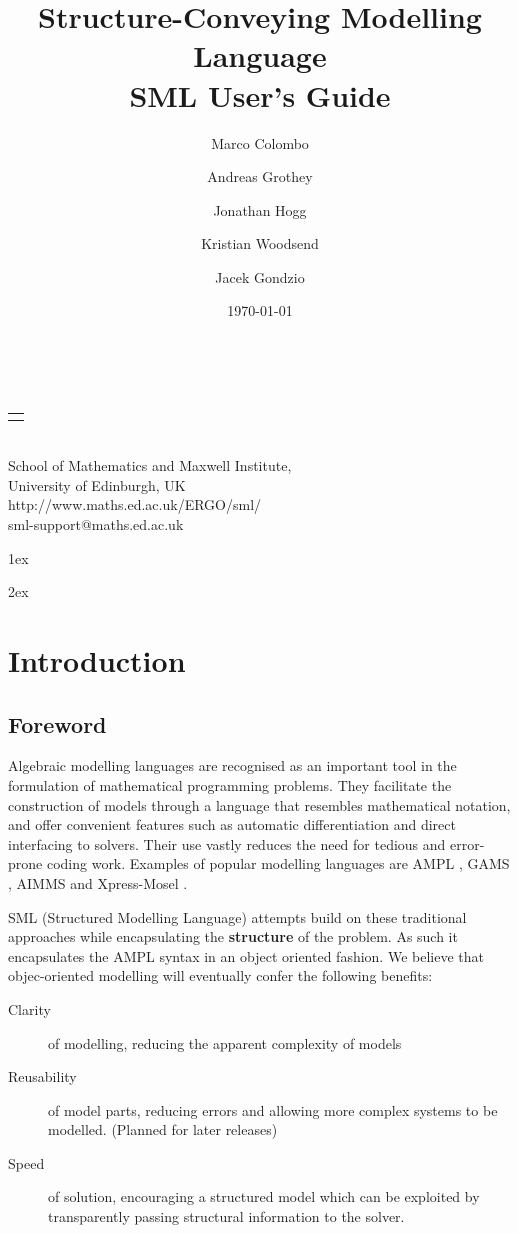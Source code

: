 \documentclass[10pt,a4paper]{report}
\makeatletter
\renewcommand{\maketitle}{
\thispagestyle{empty}
\begin{center}
\vspace*{4cm}
{\rmfamily\Huge \@title}\\
\vspace{2cm}
{\rmfamily\Large
\begin{tabular}[t]{c}%
        \@author
      \end{tabular}
}\\
\vspace{1cm}
{\rmfamily\Large School of Mathematics and Maxwell Institute, \\[0.5ex]
University of Edinburgh, UK} \\[5ex]
{\ttfamily\Large http://www.maths.ed.ac.uk/ERGO/sml/ \\[0.5ex]
                 sml-support@maths.ed.ac.uk}\\
\vspace{2cm}
{\rmfamily \Large \@date}
\end{center}
\clearpage
}
\makeatother
\begin{document}
\title{Structure-Conveying Modelling Language \\[1em]
   \textbf{SML User's Guide}}
\author{Marco Colombo
  \and Andreas Grothey
  \and Jonathan Hogg
  \and Kristian Woodsend
  \and Jacek Gondzio}
\date{\today}

\maketitle

\parindent 0pt
\parskip   1ex

\tableofcontents

\parskip   2ex

\chapter*{Introduction}


\section*{Foreword}
\label{sec:Intro}

Algebraic modelling languages are recognised as an important tool in the
formulation of mathematical programming problems. They facilitate the
construction of models through a language that resembles mathematical
notation, and offer convenient features such as automatic differentiation and
direct interfacing to solvers. Their use vastly reduces the need for tedious
and error-prone coding work. Examples of popular modelling languages
are AMPL \cite{mybib:AMPL}, GAMS \cite{mybib:GAMS}, AIMMS \cite{mybib:AIMMS}
and Xpress-Mosel \cite{mybib:Mosel}.

SML (Structured Modelling Language) attempts build on these traditional
approaches while encapsulating the {\bf structure} of the problem. As such
it encapsulates the AMPL syntax in an object oriented fashion.
%
We believe that objec-oriented modelling will eventually confer the
following benefits:
\begin{description}
   \item[Clarity] of modelling, reducing the apparent complexity of models
   \item[Reusability] of model parts, reducing errors and allowing more complex
      systems to be modelled. (Planned for later releases)
   \item[Speed] of solution, encouraging a structured model which can be
      exploited by transparently passing structural information to the solver.
\end{description}
\end{document}
